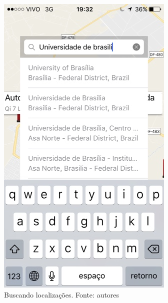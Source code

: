 \begin{anexosenv}
\begin{figure}[H]
    \centering
    \includegraphics[scale=0.5]{figuras/app_3.jpg}
    \caption[Buscando localizações]{Buscando localizações. Fonte: autores}
    \label{img:buscando_localizacoes}
\end{figure}


\end{anexosenv}
